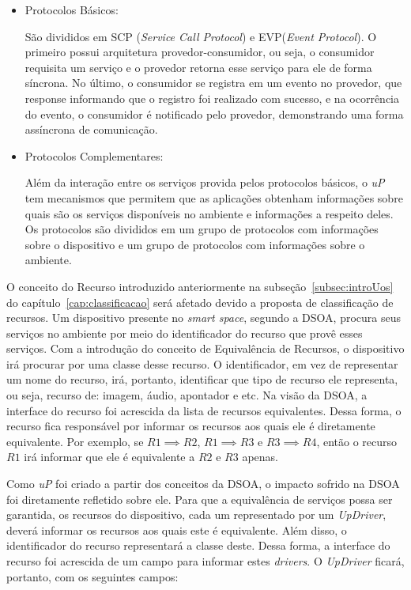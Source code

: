 \begin{itemize}
	\item Protocolos Básicos: 

		São divididos em SCP (\emph{Service Call Protocol}) e EVP(\emph{Event Protocol}). O primeiro possui arquitetura provedor-consumidor, ou seja, o consumidor requisita um serviço e o provedor retorna esse serviço para ele de forma síncrona. No último, o consumidor se registra em um evento no provedor, que response informando que o registro foi realizado com sucesso, e na ocorrência do evento, o consumidor é notificado pelo provedor, demonstrando uma forma assíncrona de comunicação.
	\item Protocolos Complementares:

		Além da interação entre os serviços provida pelos protocolos básicos, o \emph{uP} tem mecanismos que permitem que as aplicações obtenham informações sobre quais são os serviços disponíveis no ambiente e informações a respeito deles. Os protocolos são divididos em um grupo de protocolos com informações sobre o dispositivo e um grupo de protocolos com informações sobre o ambiente. 
\end{itemize}

O conceito do Recurso introduzido anteriormente na subseção~\ref{subsec:introUos} do capítulo~\ref{cap:classificacao} será afetado devido a proposta de classificação de recursos. Um dispositivo presente no \emph{smart space}, segundo a DSOA, procura seus serviços no ambiente por meio do identificador do recurso que provê esses serviços. Com a introdução do conceito de Equivalência de Recursos, o dispositivo irá procurar por uma classe desse recurso. O identificador, em vez de representar um nome do recurso, irá, portanto, identificar que tipo de recurso ele representa, ou seja, recurso de: imagem, áudio, apontador e etc. Na visão da DSOA, a interface do recurso foi acrescida da lista de recursos equivalentes. Dessa forma, o recurso fica responsável por informar os recursos aos quais ele é diretamente equivalente. Por exemplo, se $R1 \implies R2$, $R1 \implies R3$ e $R3 \implies R4$, então o recurso $R1$ irá informar que ele é equivalente a $R2$ e $R3$ apenas.

Como \emph{uP} foi criado a partir dos conceitos da DSOA, o impacto sofrido na DSOA foi diretamente refletido sobre ele. Para que a equivalência de serviços possa ser garantida, os recursos do dispositivo, cada um representado por um \emph{UpDriver}, deverá informar os recursos aos quais este é equivalente. Além disso, o identificador do recurso representará a classe deste. Dessa forma, a interface do recurso foi acrescida de um campo para informar estes \emph{drivers}. O \emph{UpDriver} ficará, portanto, com os seguintes campos:

